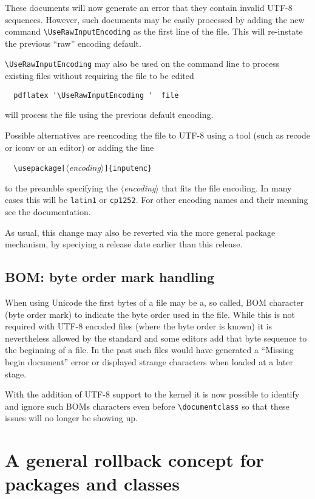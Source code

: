 \documentclass{ltnews}
\providecommand\meta[1]{$\langle$\textit{#1}$\rangle$}
\begin{document}
These documents will now generate an error that they contain invalid
UTF-8 sequences.  However, such documents may be easily processed by
adding the new command \verb|\UseRawInputEncoding| as the first line
of the file. This will re-instate the previous ``raw'' encoding
default.

\verb|\UseRawInputEncoding| may also be used on the command line to
process existing files without requiring the file to be edited
\begin{verbatim}
  pdflatex '\UseRawInputEncoding '  file
\end{verbatim}
will process the file using the previous default encoding.

Possible alternatives are reencoding the file to UTF-8 using a tool
(such as recode or iconv or an editor) or adding the line
\begin{flushleft}
\verb=  \usepackage[=\meta{encoding}\verb=]{inputenc}=
\end{flushleft}
to the preamble specifying the \meta{encoding} that fits the file
encoding.  In many cases this will be \texttt{latin1} or
\texttt{cp1252}. For other encoding names and their meaning see the
 documentation.

As usual, this change may also be reverted via the more general
 package mechanism, by speciying a release date
earlier than this release.


\subsection{BOM: byte order mark handling}

When using Unicode the first bytes of a file may be a, so called, BOM
character (byte order mark) to indicate the byte order used in the
file. While this is not required with UTF-8 encoded files (where the
byte order is known) it is nevertheless allowed by the standard and
some editors add that byte sequence to the beginning of a file. In the
past such files would have generated a ``Missing begin document''
error or displayed strange characters when loaded at a later stage.

With the addition of UTF-8 support to the kernel it is now possible to
identify and ignore such BOMs characters even before
\verb=\documentclass= so that these issues will no longer be showing
up.



\section[A general rollback concept]
        {A general rollback concept for packages and classes}
\end{document}
